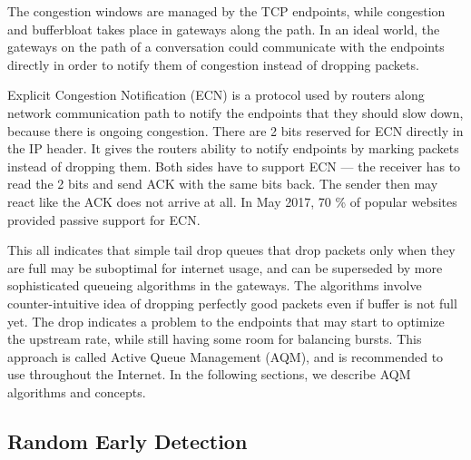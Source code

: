 The congestion windows are managed by the TCP endpoints, while congestion and bufferbloat takes place in gateways along the path. In an ideal world, the gateways on the path of a conversation could communicate with the endpoints directly in order to notify them of congestion instead of dropping packets.

Explicit Congestion Notification (ECN) \cite{rfc3168:ECN} is a protocol used by routers along network communication path to notify the endpoints that they should slow down, because there is ongoing congestion. There are 2 bits reserved for ECN directly in the IP header. It gives the routers ability to notify endpoints by marking packets instead of dropping them. Both sides have to support ECN --- the receiver has to read the 2 bits and send ACK with the same bits back. The sender then may react like the ACK does not arrive at all. In May 2017, 70 \% of popular websites provided passive support for ECN\cite{ECN:proceedings}.

This all indicates that simple tail drop queues that drop packets only when they are full may be suboptimal for internet usage, and can be superseded by more sophisticated queueing algorithms in the gateways. The algorithms involve counter-intuitive idea of dropping perfectly good packets even if buffer is not full yet. The drop indicates a problem to the endpoints that may start to optimize the upstream rate, while still having some room for balancing bursts. This approach is called Active Queue Management (AQM), and is recommended to use throughout the Internet. In the following sections, we describe AQM algorithms and concepts.

\subsection{Random Early Detection}

